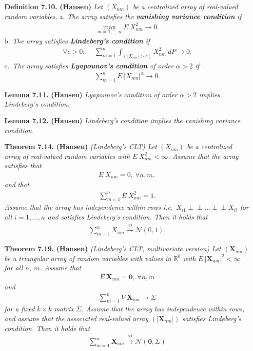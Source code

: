 \documentclass[a4paper,10pt,openany]{book}
\begin{document}
\textbf{Definition 7.10. (Hansen)} \emph{Let \((X_{nm})\) be a centralized array of real-valued random variables.}
a. \emph{The array satisfies the \textbf{vanishing variance condition} if}
\begin{align*}
      \max_{m=1,...,n}E\ X_{nm}^2\to 0.\tag{7.8}
  \end{align*}
b. \emph{The array satisfies \textbf{Lindeberg's condition} if}
\begin{align*}
      \forall c>0:\hspace{15pt}\sum_{m=1}^n\int_{(\vert X_{nm}\vert>c)}X_{nm}^2\ dP\to 0.\tag{7.9}
  \end{align*}
c.~\emph{The array satisfies \textbf{Lyapounov's condition} of order \(\alpha>2\) if}
\begin{align*}
      \sum_{m=1}^nE\ \vert X_{nm}\vert ^\alpha\to 0.\tag{7.10}
  \end{align*}

\textbf{Lemma 7.11. (Hansen)} \emph{Lyapounov's condition of order \(\alpha>2\) implies Lindeberg's condition.}

\textbf{Lemma 7.12. (Hansen)} \emph{Lindeberg's condition implies the vanishing variance condition.}

\textbf{Theorem 7.14. (Hansen)} \emph{(Lindeberg's CLT) Let \((X_{nm})\) be a centralized array of real-valued random variables with \(E\ X_{nm}^2<\infty\). Assume that the array satisfies that}
\begin{align*}
    E\ X_{nm}=0,\ \forall n,m,
\end{align*}
\emph{and that}
\begin{align*}
    \sum_{m=1}^n E\ X^2_{nm}=1.\tag{7.13}
\end{align*}
\emph{Assume that the array has independence within rows i.e.~\(X_{i1}\perp \!\!\! \perp ... \perp \!\!\! \perp X_{ii}\) for all \(i=1,...,n\) and satisfies Lindeberg's condition. Then it holds that}
\begin{align*}
    \sum_{m=1}^nX_{nm}\stackrel{\mathcal{D}}{\to} \mathcal{N}(0,1).
\end{align*}

\textbf{Theorem 7.19. (Hansen)} \emph{(Lindeberg's CLT, multivariate version) Let \((\mathbf{X}_{nm})\) be a triangular array of random variables with values in \(\mathbb{R}^k\) with \(E\ \vert \mathbf{X}_{nm}\vert^2<\infty\) for all \(n\), \(m\). Assume that}
\begin{align*}
    E\ \mathbf{X}_{nm}=\mathbf{0},\ \forall n,m
\end{align*}
\emph{and}
\begin{align*}
    \sum_{m=1}^n V\ \mathbf{X}_{nm}\to \Sigma
\end{align*}
\emph{for a fixed \(k\times k\) matrix \(\Sigma\). Assume that the array has independence within rows, and assume that the associated real-valued array \((\vert\mathbf{X}_{nm}\vert )\) satisfies Lindeberg's condition. Then it holds that}
\begin{align*}
    \sum_{m=1}^n\mathbf{X}_{nm}\stackrel{\mathcal{D}}{\to} \mathcal{N}(\mathbf{0},\Sigma)
\end{align*}
\end{document}
